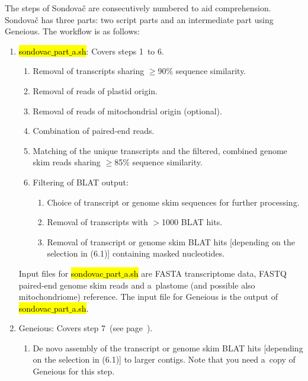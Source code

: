 \documentclass[a4paper, 11pt, twoside]{article}
\renewcommand{\texttt}[1]{\hl{\ttfamily #1}}
\begin{document}
The steps of Sondovač are consecutively numbered to aid comprehension. Sondovač has three parts: two script parts and an intermediate part using Geneious. The workflow is as follows:

\begin{enumerate}[label=\textbf{\Alph*.}]
  \label{pipeline-overview}
  \item \texttt{sondovac$\_$part$\_$a.sh}: Covers steps 1~to 6.
    \begin{enumerate}[label=\textbf{\arabic*.}]
      \item Removal of transcripts sharing $\geq$90\% sequence similarity.
      \item Removal of reads of plastid origin.
      \item Removal of reads of mitochondrial origin (optional).
      \item Combination of paired-end reads.
      \item Matching of the unique transcripts and the filtered, combined genome skim reads sharing $\geq$85\% sequence similarity.
      \item Filtering of BLAT output:
	\begin{enumerate}[label=\textbf{6.\arabic*.}]
	\item Choice of transcript or genome skim sequences for further processing.
	\item Removal of transcripts with $>$1000 BLAT hits.
	\item Removal of transcript or genome skim BLAT hits [depending on the selection in (6.1)] containing masked nucleotides.
	\end{enumerate}
    \end{enumerate}

  Input files for \texttt{sondovac$\_$part$\_$a.sh} are FASTA transcriptome data, FASTQ paired-end genome skim reads and a~plastome (and possible also mitochondriome) reference. The input file for Geneious is the output of \texttt{sondovac$\_$part$\_$a.sh}.

  \item Geneious: Covers step 7~(see page~\pageref{geneious}).
    \begin{enumerate}[label=\textbf{\arabic*.}, resume]
    \item De novo assembly of the transcript or genome skim BLAT hits [depending on the selection in (6.1)] to larger contigs. Note that you need a~copy of Geneious for this step.
    \end{enumerate}


\end{enumerate}
\end{document}
